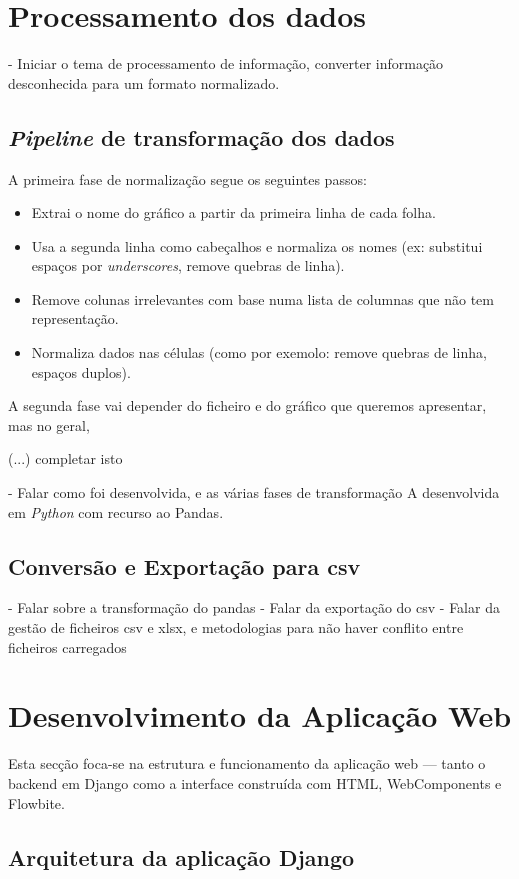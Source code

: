 \section{Processamento dos dados}
- Iniciar o tema de processamento de informação, converter informação desconhecida para um formato normalizado.

\subsection{\textit{Pipeline} de transformação dos dados}
A primeira fase de normalização segue os seguintes passos:
\begin{itemize}
    \item Extrai o nome do gráfico a partir da primeira linha de cada folha.
    \item Usa a segunda linha como cabeçalhos e normaliza os nomes (ex: substitui espaços por \textit{underscores}, remove quebras de linha).
    \item Remove colunas irrelevantes com base numa lista de columnas que não tem representação.
    \item Normaliza dados nas células (como por exemolo: remove quebras de linha, espaços duplos).
\end{itemize}

A segunda fase vai depender do ficheiro e do gráfico que queremos apresentar, mas no geral,

(...) completar isto

- Falar como foi desenvolvida, e as várias fases  de transformação A desenvolvida em \textit{Python} com recurso ao Pandas. 


\subsection{Conversão e Exportação para \gls{csv}}
- Falar sobre a transformação do pandas\n
- Falar da exportação do \gls{csv}\n
- Falar da gestão de ficheiros  \gls{csv} e \gls{xlsx}, e metodologias para não haver conflito entre ficheiros carregados\n


\section{Desenvolvimento da Aplicação Web}

Esta secção foca-se na estrutura e funcionamento da aplicação web — tanto o backend em Django como a interface construída com HTML, WebComponents e Flowbite.
\subsection{Arquitetura da aplicação Django}

